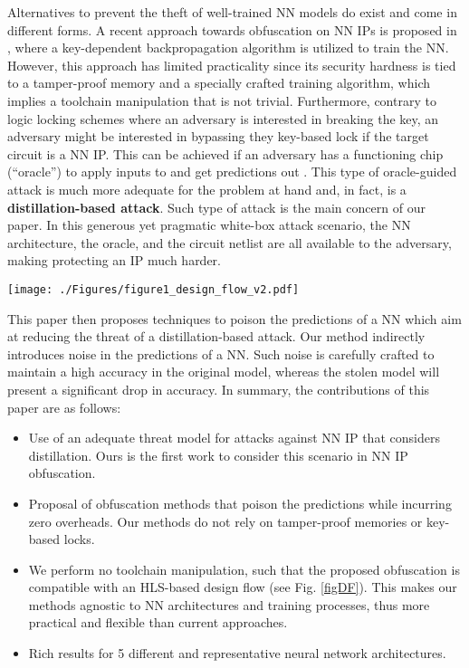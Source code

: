 \documentclass[10pt, twocolumn, conference]{IEEEtran}
\begin{document}
 
Alternatives to prevent the theft of well-trained NN models do exist and come in different forms. A recent approach towards obfuscation on NN IPs is proposed in \cite{rfHwAssDate}, where a key-dependent backpropagation algorithm is utilized to train the NN. However, this approach has limited practicality since its security hardness is tied to a tamper-proof memory and a specially crafted training algorithm, which implies a toolchain manipulation that is not trivial. Furthermore, contrary to logic locking schemes where an adversary is interested in breaking the key, an adversary might be interested in bypassing they key-based lock if the target circuit is a NN IP. This can be achieved  if an adversary has a functioning chip (``oracle'') to apply inputs to and get predictions out \cite{rfPrdPsn}. This type of oracle-guided attack is much more adequate for the problem at hand and, in fact, is a \textbf{distillation-based attack}. Such type of attack is the main concern of our paper. In this generous yet pragmatic white-box attack scenario, the NN architecture, the oracle, and the circuit netlist are all available to the adversary, making protecting an IP much harder.

\begin{figure*}[tb]
\centering
{\texttt{[image: ./Figures/figure1\_design\_flow\_v2.pdf]}} \vspace{-10pt}
\caption{Design flow for obfuscation of NN IP, for both FPGA and ASIC designs.}
\label{figDF}
\end{figure*}

This paper then proposes techniques to poison the predictions of a NN which aim at reducing the threat of a distillation-based attack. Our method indirectly introduces noise in the predictions of a NN. Such noise is carefully crafted to maintain a high accuracy in the original model, whereas the stolen model will present a significant drop in accuracy. In summary, the contributions of this paper are as follows:

\begin{itemize}
    \item Use of an adequate threat model for attacks against NN IP that considers distillation. Ours is the first work to consider this scenario in NN IP obfuscation.
    \item Proposal of obfuscation methods that poison the predictions while incurring zero overheads. Our methods do not rely on tamper-proof memories or key-based locks.
    \item We perform no toolchain manipulation, such that the proposed obfuscation is compatible with an HLS-based design flow (see Fig. \ref{figDF}). This makes our methods agnostic to NN architectures and training processes, thus more practical and flexible than current approaches.
    \item Rich results for 5 different and representative neural network architectures.

\end{itemize}
\end{document}
